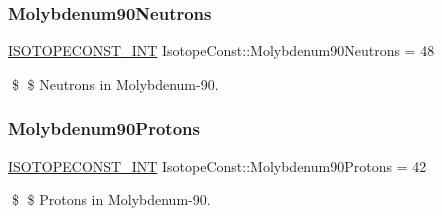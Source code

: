 \subsubsection{\texorpdfstring{Molybdenum90\+Neutrons}{Molybdenum90Neutrons}}
{\footnotesize\ttfamily \mbox{\hyperlink{group___isotope_const-_macros_ga5f18360b3e99483a35c32d789e62621c}{I\+S\+O\+T\+O\+P\+E\+C\+O\+N\+S\+T\+\_\+\+I\+NT}} Isotope\+Const\+::\+Molybdenum90\+Neutrons = 48}

\$ \$ Neutrons in Molybdenum-\/90. \mbox{\label{group___isotope_const-_molybdenum-_mo90_gaf66b23ab25ccbd79aefcf92239f5d676}} 
\subsubsection{\texorpdfstring{Molybdenum90\+Protons}{Molybdenum90Protons}}
{\footnotesize\ttfamily \mbox{\hyperlink{group___isotope_const-_macros_ga5f18360b3e99483a35c32d789e62621c}{I\+S\+O\+T\+O\+P\+E\+C\+O\+N\+S\+T\+\_\+\+I\+NT}} Isotope\+Const\+::\+Molybdenum90\+Protons = 42}

\$ \$ Protons in Molybdenum-\/90. 